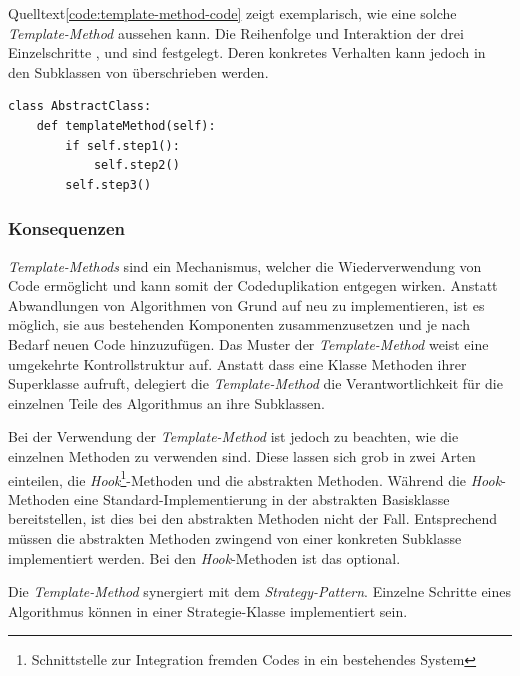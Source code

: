 Quelltext\ref{code:template-method-code} zeigt exemplarisch, wie eine solche \emph{Template-Method} aussehen kann. Die Reihenfolge und Interaktion der drei Einzelschritte ,  und  sind festgelegt. Deren konkretes Verhalten kann jedoch in den Subklassen von  überschrieben werden.

\lstset{language=python}
\begin{lstlisting}[caption={Exemplarische Implementierung einer \emph{Template-Method}}, label=code:template-method-code]
class AbstractClass:
	def templateMethod(self):
    	if self.step1():
        	self.step2()
    	self.step3()
\end{lstlisting}


\subsubsection*{Konsequenzen}

\emph{Template-Methods} sind ein Mechanismus, welcher die Wiederverwendung von Code ermöglicht und kann somit der Codeduplikation entgegen wirken. Anstatt Abwandlungen von Algorithmen von Grund auf neu zu implementieren, ist es möglich, sie aus bestehenden Komponenten zusammenzusetzen und je nach Bedarf neuen Code hinzuzufügen. Das Muster der \emph{Template-Method} weist eine umgekehrte Kontrollstruktur auf. Anstatt dass eine Klasse Methoden ihrer Superklasse aufruft, delegiert die \emph{Template-Method} die Verantwortlichkeit für die einzelnen Teile des Algorithmus an ihre Subklassen.

Bei der Verwendung der \emph{Template-Method} ist jedoch zu beachten, wie die einzelnen Methoden zu verwenden sind. Diese lassen sich grob in zwei Arten einteilen, die \emph{Hook}\footnote{Schnittstelle zur Integration fremden Codes in ein bestehendes System}-Methoden und die abstrakten Methoden. Während die \emph{Hook}-Methoden eine Standard-Implementierung in der abstrakten Basisklasse bereitstellen, ist dies bei den abstrakten Methoden nicht der Fall. Entsprechend müssen die abstrakten Methoden zwingend von einer konkreten Subklasse implementiert werden. Bei den \emph{Hook}-Methoden ist das optional.

Die \emph{Template-Method} synergiert mit dem \emph{Strategy-Pattern}. Einzelne Schritte eines Algorithmus können in einer Strategie-Klasse implementiert sein. \cite{gamma_design_1995}